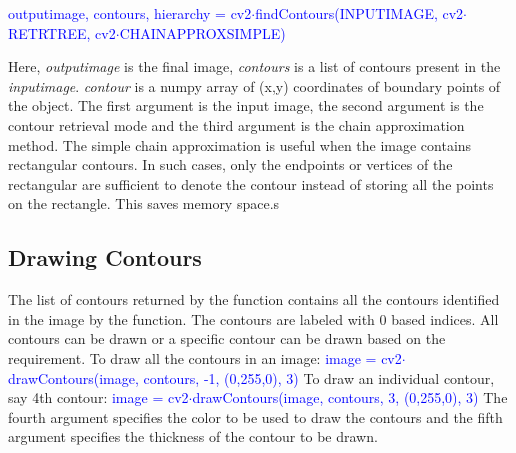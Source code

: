 \documentclass[a4paper,12pt]{article}
\begin{document}
\textcolor{blue}{output\textunderscore image, contours, hierarchy = cv2$\cdot$findContours(INPUT\textunderscore IMAGE,
					cv2$\cdot$RETR\textunderscore TREE,
					cv2$\cdot$CHAIN\textunderscore APPROX\textunderscore SIMPLE)}

\vspace{1cm}
Here, \emph{output\textunderscore image} is the final image, \emph{contours} is a list of contours present in the \emph{input\textunderscore image}.
\emph{contour} is a numpy array of (x,y) coordinates of boundary points of the object. The first argument is the input image, the second 
argument is the contour retrieval mode and the third argument is the chain approximation method. The simple chain approximation is useful 
when the image contains rectangular contours. In such cases, only the endpoints or vertices of the rectangular are sufficient to denote the
contour instead of storing all the points on the rectangle. This saves memory space.s
			
\subsection{Drawing Contours}
The list of contours returned by the function contains all the contours identified in the image by the function. The contours are labeled with 0 based indices. 
All contours can be drawn or a specific contour can be drawn based on the requirement.
\vspace{0.5cm}
\newline To draw all the contours in an image:
\newline \textcolor{blue}{image = cv2$\cdot$drawContours(image, contours, -1, (0,255,0), 3)}
\vspace{0.5cm}
\newline To draw an individual contour, say 4th contour:
\newline \textcolor{blue}{image = cv2$\cdot$drawContours(image, contours, 3, (0,255,0), 3)}
\vspace{0.5cm}
\newline The fourth argument specifies the color to be used to draw the contours and the fifth argument specifies the thickness
of the contour to be drawn.
\end{document}
